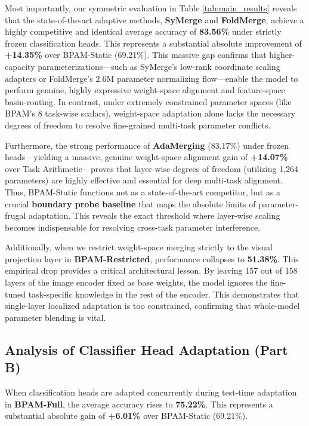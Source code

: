 Most importantly, our symmetric evaluation in Table \ref{tab:main_results} reveals that the state-of-the-art adaptive methods, {\bf SyMerge} and {\bf FoldMerge}, achieve a highly competitive and identical average accuracy of {\bf 83.56\%} under strictly frozen classification heads. This represents a substantial absolute improvement of {\bf +14.35\%} over BPAM-Static (69.21\%). This massive gap confirms that higher-capacity parameterizations—such as SyMerge's low-rank coordinate scaling adapters or FoldMerge's 2.6M parameter normalizing flow—enable the model to perform genuine, highly expressive weight-space alignment and feature-space basin-routing. In contrast, under extremely constrained parameter spaces (like BPAM's 8 task-wise scalars), weight-space adaptation alone lacks the necessary degrees of freedom to resolve fine-grained multi-task parameter conflicts.

Furthermore, the strong performance of {\bf AdaMerging} (83.17\%) under frozen heads—yielding a massive, genuine weight-space alignment gain of {\bf +14.07\%} over Task Arithmetic—proves that layer-wise degrees of freedom (utilizing 1,264 parameters) are highly effective and essential for deep multi-task alignment. Thus, BPAM-Static functions not as a state-of-the-art competitor, but as a crucial {\bf boundary probe baseline} that maps the absolute limits of parameter-frugal adaptation. This reveals the exact threshold where layer-wise scaling becomes indispensable for resolving cross-task parameter interference.

Additionally, when we restrict weight-space merging strictly to the visual projection layer in {\bf BPAM-Restricted}, performance collapses to {\bf 51.38\%}. This empirical drop provides a critical architectural lesson. By leaving 157 out of 158 layers of the image encoder fixed as base weights, the model ignores the fine-tuned task-specific knowledge in the rest of the encoder. This demonstrates that single-layer localized adaptation is too constrained, confirming that whole-model parameter blending is vital.

\subsection{Analysis of Classifier Head Adaptation (Part B)}
When classification heads are adapted concurrently during test-time adaptation in {\bf BPAM-Full}, the average accuracy rises to {\bf 75.22\%}. This represents a substantial absolute gain of {\bf +6.01\%} over BPAM-Static (69.21\%). 

